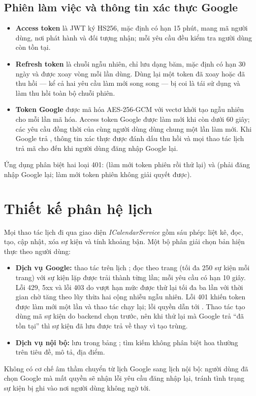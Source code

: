 \subsection{Phiên làm việc và thông tin xác thực Google}
\begin{itemize}
  \item \textbf{Access token} là JWT ký HS256, mặc định có hạn 15 phút, mang mã người dùng, nơi phát hành và đối tượng nhận; mỗi yêu cầu đều kiểm tra người dùng còn tồn tại.
  \item \textbf{Refresh token} là chuỗi ngẫu nhiên, chỉ lưu dạng băm, mặc định có hạn 30 ngày và được xoay vòng mỗi lần dùng. Dùng lại một token đã xoay hoặc đã thu hồi — kể cả hai yêu cầu làm mới song song — bị coi là tái sử dụng và làm thu hồi toàn bộ chuỗi phiên.
  \item \textbf{Token Google} được mã hóa AES-256-GCM với vectơ khởi tạo ngẫu nhiên cho mỗi lần mã hóa. Access token Google được làm mới khi còn dưới 60 giây; các yêu cầu đồng thời của cùng người dùng dùng chung một lần làm mới. Khi Google trả , thông tin xác thực được đánh dấu thu hồi và mọi thao tác lịch trả mã  cho đến khi người dùng đăng nhập Google lại.
\end{itemize}
Ứng dụng phân biệt hai loại 401:  (làm mới token phiên rồi thử lại) và  (phải đăng nhập Google lại; làm mới token phiên không giải quyết được).

\section{Thiết kế phân hệ lịch}
Mọi thao tác lịch đi qua giao diện \textit{ICalendarService} gồm sáu phép: liệt kê, đọc, tạo, cập nhật, xóa sự kiện và tính khoảng bận. Một bộ phân giải chọn bản hiện thực theo người dùng:
\begin{itemize}
  \item \textbf{Dịch vụ Google:} thao tác trên lịch ; đọc theo trang (tối đa 250 sự kiện mỗi trang) với sự kiện lặp được trải thành từng lần; mỗi yêu cầu có hạn 10 giây. Lỗi 429, 5xx và lỗi 403 do vượt hạn mức được thử lại tối đa ba lần với thời gian chờ tăng theo lũy thừa hai cộng nhiễu ngẫu nhiên. Lỗi 401 khiến token được làm mới một lần và thao tác chạy lại; lỗi quyền dẫn tới . Thao tác tạo dùng mã sự kiện do backend chọn trước, nên khi thử lại mà Google trả “đã tồn tại” thì sự kiện đã lưu được trả về thay vì tạo trùng.
  \item \textbf{Dịch vụ nội bộ:} lưu trong bảng ; tìm kiếm không phân biệt hoa thường trên tiêu đề, mô tả, địa điểm.
\end{itemize}
Không có cơ chế âm thầm chuyển từ lịch Google sang lịch nội bộ: người dùng đã chọn Google mà mất quyền sẽ nhận lỗi yêu cầu đăng nhập lại, tránh tình trạng sự kiện bị ghi vào nơi người dùng không ngờ tới.

